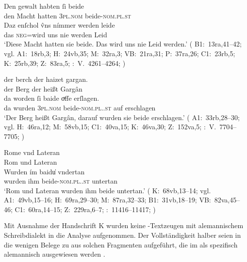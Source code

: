 \begin{exe}
\ex \label{ex:neutralpos}
	\gll Den gewalt habten ſi beide \\
		den Macht hatten \textsc{3pl\subM.nom} beide-\textsc{nom.pl\subM.st} \\
\sn \gll Daz enſchol v̂ns nímmer werden leide \\
		das \textsc{neg}=wird uns nie werden Leid \\
	\trans `Diese Macht hatten sie beide. Das wird uns nie Leid werden.'
		(%
			B1:~13ra,41--42; vgl.
			A1:~18rb,3;
			H:~24vb,35;
			M:~32ra,3;
			VB:~21ra,31;
			P:~37ra,26;
			C1:~23rb,5;
			K:~25rb,39;
			Z:~83ra,5;
			\KC:~V.~4261--4264;
			\cite[159]{schroeder1895}%
		)

\ex \label{ex:neutralpos2}
	\begin{xlist}
	\ex \label{ex:neutralpos2_1}
		\gll der berch der haizet gargan. \\
			der Berg der heißt Gargân \\
	\sn \gll da worden ſi baide oͮffe erſlagen. \\
			da wurden \textsc{3pl\subM.nom} beide-\textsc{nom.pl.\MascM.st} auf
				erschlagen \\
		\trans `Der Berg heißt Gargân, darauf wurden sie beide erschlagen.'
			(%
				A1:~33rb,28--30; vgl.
				H:~46ra,12;
				M:~58vb,15;
				C1:~40va,15;
				K:~46va,30;
				Z:~152va,5;
				\KC:~V.~7704--7705;
				\cite[222]{schroeder1895}%
			)

	\ex \label{ex:neutralpos2_2}
		\gll Rome vnd Lateran \\
			Rom und Lateran \\
	\sn \gll Wurden ím baidu̍ vndertan \\
			wurden ihm beide-\textsc{nom.pl.\NeutI.st} untertan \\
		\trans `Rom und Lateran wurden ihm beide untertan.'
			(%
				K:~68vb,13--14; vgl.
				A1:~49vb,15--16;
				H:~69ra,29--30;
				M:~87ra,32--33;
				B1:~31vb,18--19;
				VB:~82va,45--46;
				C1:~60ra,14--15;
				Z:~229ra,6--7;
				\KC:~11416--11417;
				\cite[290]{schroeder1895}%
			)
		\\
	\end{xlist}
\end{exe}

Mit Ausnahme der Handschrift K wurden keine \KC{}-Text\-zeugen mit
alemannischem Schreibdialekt in die Analyse
aufgenommen. Der Vollständigkeit halber seien in  die
wenigen Belege zu  aus solchen Fragmenten aufgeführt, die im
\citet{hsc} als spezifisch alemannisch ausgewiesen
werden \autocite[vgl.][4, 44, 54]{wolf:kckat}.

